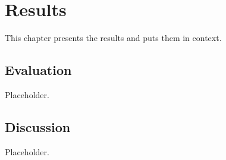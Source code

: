 
\chapter{Results}\label{ch:results}

This chapter presents the results and puts them in context.

\section{Evaluation}\label{sec:evaluation}

Placeholder.

\section{Discussion}\label{sec:discussion}

Placeholder.
